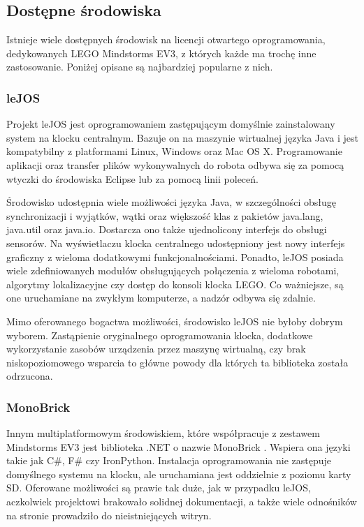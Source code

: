 \subsection{Dostępne środowiska}

Istnieje wiele dostępnych środowisk na licencji otwartego oprogramowania, dedykowanych LEGO Mindstorms EV3, z których każde ma trochę inne zastosowanie. Poniżej opisane są najbardziej popularne z nich.

\subsubsection{leJOS}

Projekt leJOS \cite{lejos} jest oprogramowaniem zastępującym domyślnie zainstalowany system na klocku centralnym. Bazuje on na maszynie wirtualnej języka Java i jest kompatybilny z platformami Linux, Windows oraz Mac OS X. Programowanie aplikacji oraz transfer plików wykonywalnych do robota odbywa się za pomocą wtyczki do środowiska Eclipse lub za pomocą linii poleceń.

Środowisko udostępnia wiele możliwości języka Java, w szczególności obsługę synchronizacji i wyjątków, wątki oraz większość klas z pakietów java.lang, java.util oraz java.io. Dostarcza ono także ujednolicony interfejs do obsługi sensorów. Na wyświetlaczu klocka centralnego udostępniony jest nowy interfejs graficzny z wieloma dodatkowymi funkcjonalnościami. Ponadto, leJOS posiada wiele zdefiniowanych modułów obsługujących połączenia z wieloma robotami, algorytmy lokalizacyjne czy dostęp do konsoli klocka LEGO. Co ważniejsze, są one uruchamiane na zwykłym komputerze, a nadzór odbywa się zdalnie.

Mimo oferowanego bogactwa możliwości, środowisko leJOS nie byłoby dobrym wyborem. Zastąpienie oryginalnego oprogramowania klocka, dodatkowe wykorzystanie zasobów urządzenia przez maszynę wirtualną, czy brak niskopoziomowego wsparcia to główne powody dla których ta biblioteka została odrzucona.

\subsubsection{MonoBrick}

Innym multiplatformowym środowiskiem, które współpracuje z zestawem Mindstorms EV3 jest biblioteka .NET o nazwie MonoBrick \cite{monobrick}. Wspiera ona języki takie jak C\#, F\# czy IronPython. Instalacja oprogramowania nie zastępuje domyślnego systemu na klocku, ale uruchamiana jest oddzielnie z poziomu karty SD. Oferowane możliwości są prawie tak duże, jak w przypadku leJOS, aczkolwiek projektowi brakowało solidnej dokumentacji, a także wiele odnośników na stronie prowadziło do nieistniejących witryn.

